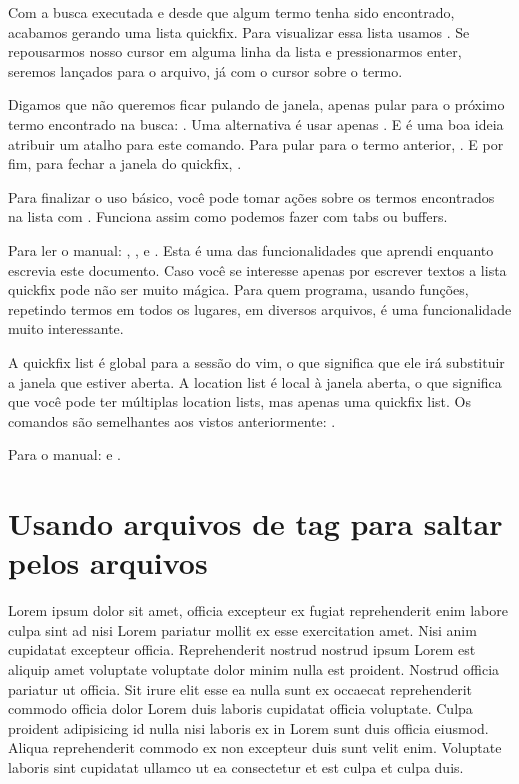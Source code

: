 
Com a busca executada e desde que algum termo tenha sido encontrado, acabamos gerando uma lista quickfix.
Para visualizar essa lista usamos .
Se repousarmos nosso cursor em alguma linha da lista e pressionarmos enter,
seremos lançados para o arquivo, já com o cursor sobre o termo.


Digamos que não queremos ficar pulando de janela, apenas pular para o próximo termo encontrado na busca: .
Uma alternativa é usar apenas . 
E é uma boa ideia atribuir um atalho para este comando.
Para pular para o termo anterior, .
E por fim, para fechar a janela do quickfix, .

Para finalizar o uso básico, você pode tomar ações sobre os termos encontrados na lista com .
Funciona assim como podemos fazer com tabs ou buffers.

Para ler o manual: , ,  e .
Esta é uma das funcionalidades que aprendi enquanto escrevia este documento.
Caso você se interesse apenas por escrever textos a lista quickfix pode não ser muito mágica.
Para quem programa, usando funções, repetindo termos em todos os lugares, em diversos arquivos,
é uma funcionalidade muito interessante.

A quickfix list é global para a sessão do vim, o que significa que ele irá substituir a janela que estiver aberta.
A location list é local à janela aberta, o que significa que você pode ter múltiplas location lists, mas apenas uma quickfix list.
Os comandos são semelhantes aos vistos anteriormente:    .

Para o manual:   e .

\section{Usando arquivos de tag para saltar pelos arquivos}
Lorem ipsum dolor sit amet, officia excepteur ex fugiat reprehenderit enim labore culpa sint ad nisi Lorem pariatur mollit ex esse exercitation amet. Nisi anim cupidatat excepteur officia. Reprehenderit nostrud nostrud ipsum Lorem est aliquip amet voluptate voluptate dolor minim nulla est proident. Nostrud officia pariatur ut officia. Sit irure elit esse ea nulla sunt ex occaecat reprehenderit commodo officia dolor Lorem duis laboris cupidatat officia voluptate. Culpa proident adipisicing id nulla nisi laboris ex in Lorem sunt duis officia eiusmod. Aliqua reprehenderit commodo ex non excepteur duis sunt velit enim. Voluptate laboris sint cupidatat ullamco ut ea consectetur et est culpa et culpa duis.

\newpage
